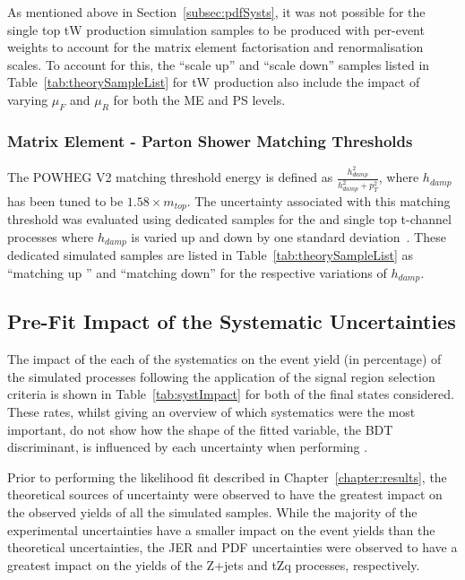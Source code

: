 As mentioned above in Section~\ref{subsec:pdfSysts}, it was not possible for the single top tW production simulation samples to be produced with per-event weights to account for the matrix element factorisation and renormalisation scales.
To account for this, the ``scale up'' and ``scale down'' samples listed in Table~\ref{tab:theorySampleList} for tW production also include the impact of varying $\mu_{F}$ and $\mu_{R}$ for both the ME and PS levels.

\subsubsection{Matrix Element - Parton Shower Matching Thresholds}
The POWHEG V2 matching threshold energy is defined as $\frac{h_{damp}^{2}}{h_{damp}^{2}+p_{T}^{2}}$, where $h_{damp}$ has been tuned to be $1.58 \times m_{top}$.
The uncertainty associated with this matching threshold was evaluated using dedicated samples for the \ttbar and single top t-channel processes where $h_{damp}$ is varied up and down by one standard deviation~\cite{CMS:2016kle}.
These dedicated simulated samples are listed in Table~\ref{tab:theorySampleList} as ``matching up '' and ``matching down'' for the respective variations of $h_{damp}$.

\subsection{Pre-Fit Impact of the Systematic Uncertainties}\label{sec:uncertainitiesPreFitImpact}
The impact of the each of the systematics on the event yield (in percentage) of the simulated processes following the application of the signal region selection criteria is shown in Table~\ref{tab:systImpact} for both of the final states considered.
These rates, whilst giving an overview of which systematics were the most important, do not show how the shape of the fitted variable, the BDT discriminant, is influenced by each uncertainty when performing .

Prior to performing the likelihood fit described in Chapter~\ref{chapter:results}, the theoretical sources of uncertainty were observed to have the greatest impact on the observed yields of all the simulated samples.
While the majority of the experimental uncertainties have a smaller impact on the event yields than the theoretical uncertainties, the JER and PDF uncertainties were observed to have a greatest impact on the yields of the Z+jets and tZq processes, respectively.

